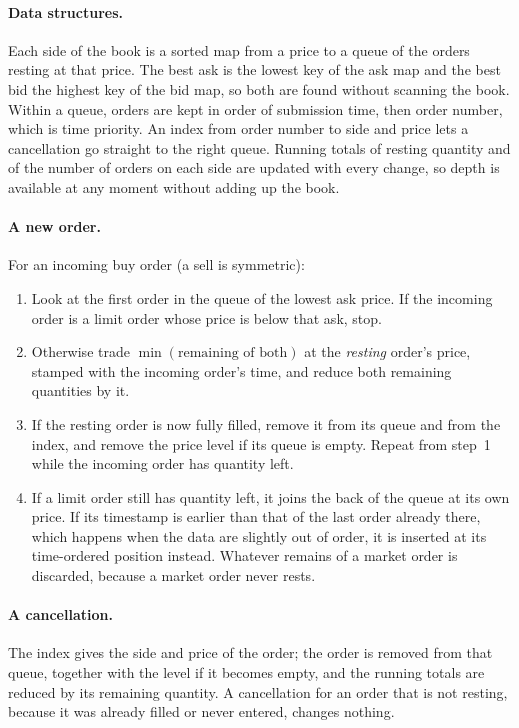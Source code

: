 \paragraph{Data structures.} Each side of the book is a sorted map from a
price to a queue of the orders resting at that price. The best ask is the
lowest key of the ask map and the best bid the highest key of the bid map,
so both are found without scanning the book. Within a queue, orders are kept
in order of submission time, then order number, which is time priority. An
index from order number to side and price lets a cancellation go straight
to the right queue. Running totals of resting quantity and of the number of
orders on each side are updated with every change, so depth is available at
any moment without adding up the book.

\paragraph{A new order.} For an incoming buy order (a sell is symmetric):
\begin{enumerate}
  \item Look at the first order in the queue of the lowest ask price. If the
  incoming order is a limit order whose price is below that ask, stop.
  \item Otherwise trade $\min(\text{remaining of both})$ at the
  \emph{resting} order's price, stamped with the incoming order's time, and
  reduce both remaining quantities by it.
  \item If the resting order is now fully filled, remove it from its queue
  and from the index, and remove the price level if its queue is empty.
  Repeat from step~1 while the incoming order has quantity left.
  \item If a limit order still has quantity left, it joins the back of the
  queue at its own price. If its timestamp is earlier than that of the last
  order already there, which happens when the data are slightly out of
  order, it is inserted at its time-ordered position instead. Whatever
  remains of a market order is discarded, because a market order never
  rests.
\end{enumerate}

\paragraph{A cancellation.} The index gives the side and price of the order;
the order is removed from that queue, together with the level if it becomes
empty, and the running totals are reduced by its remaining quantity. A
cancellation for an order that is not resting, because it was already
filled or never entered, changes nothing.

